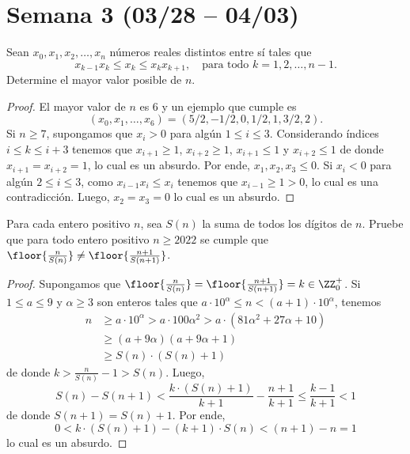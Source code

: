\section{Semana 3 (03/28 -- 04/03)}


\begin{probEG}
	Sean $x_0,x_1,x_2,\dots,x_n$ números reales distintos entre sí tales que
	\[x_{k-1}x_k\le x_k\le x_kx_{k+1},\quad\text{para todo }k=1,2,\dots,n-1.\]
	Determine el mayor valor posible de $n$.
\end{probEG}

\begin{proof}
	El mayor valor de $n$ es $6$ y un ejemplo que cumple es
	\[(x_0,x_1,\dots,x_6)=(5/2,-1/2,0,1/2,1,3/2,2).\]
	Si $n\ge 7$, supongamos que $x_i>0$ para algún $1\le i\le 3$. Considerando índices $i\le k\le i+3$ tenemos que $x_{i+1}\ge 1$, $x_{i+2}\ge 1$, $x_{i+1}\le 1$ y $x_{i+2}\le 1$ de donde $x_{i+1}=x_{i+2}=1$, lo cual es un absurdo. Por ende, $x_1,x_2,x_3\le 0$. Si $x_i<0$ para algún $2\le i\le 3$, como $x_{i-1}x_i\le x_i$ tenemos que $x_{i-1}\ge 1>0$, lo cual es una contradicción. Luego, $x_2=x_3=0$ lo cual es un absurdo.
\end{proof}

\begin{probEG}
	Para cada entero positivo $n$, sea $S(n)$ la suma de todos los dígitos de $n$. Pruebe que para todo entero positivo $n\ge 2022$ se cumple que $\floor{\frac{n}{S(n)}}\ne\floor{\frac{n+1}{S(n+1)}}$.
\end{probEG}

\begin{proof}
	Supongamos que $\floor{\frac{n}{S(n)}}=\floor{\frac{n+1}{S(n+1)}}=k\in\ZZ^+_0$. Si $1\le a\le 9$ y $\alpha\ge 3$ son enteros tales que $a\cdot 10^\alpha\le n<(a+1)\cdot 10^\alpha$, tenemos
	\begin{align*}
		n
		&\ge a\cdot 10^\alpha>a\cdot 100\alpha^2>a\cdot(81\alpha^2+27\alpha+10)\\
		&\ge (a+9\alpha)(a+9\alpha+1)\\
		&\ge S(n)\cdot(S(n)+1)
	\end{align*}
	de donde $k>\frac{n}{S(n)}-1>S(n)$. Luego,
	\[S(n)-S(n+1)<\frac{k\cdot (S(n)+1)}{k+1}-\frac{n+1}{k+1}\le\frac{k-1}{k+1}<1\]
	de donde $S(n+1)=S(n)+1$. Por ende,
	\[0<k\cdot(S(n)+1)-(k+1)\cdot S(n)<(n+1)-n=1\]
	lo cual es un absurdo.
\end{proof}

